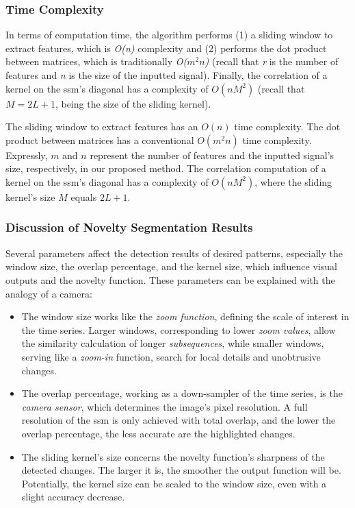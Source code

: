 \subsubsection{Time Complexity}
\label{sec:time_complexity}

In terms of computation time, the algorithm performs (1) a sliding window to extract features, which is \textit{O(n)} complexity and (2) performs the dot product between matrices, which is traditionally \textit{O($m^2n$)} (recall that \textit{r} is the number of features and \textit{n} is the size of the inputted signal). Finally, the correlation of a kernel on the \gls{ssm}'s diagonal has a complexity of $O(nM^2)$ (recall that $M=2L+1$, being the size of the sliding kernel).

The sliding window to extract features has an $O(n)$ time complexity. The dot product between matrices has a conventional $O(m^2n)$ time complexity. Expressly, $m$ and $n$ represent the number of features and the inputted signal's size, respectively, in our proposed method. The correlation computation of a kernel on the \gls{ssm}'s diagonal has a complexity of $O(nM^2)$, where the sliding kernel's size $M$ equals $2L+1$.

\subsubsection{Discussion of Novelty Segmentation Results}
\label{sec:novelty_seg_discussion}
Several parameters affect the detection results of desired patterns, especially the window size, the overlap percentage, and the kernel size, which influence visual outputs and the novelty function. These parameters can be explained with the analogy of a camera:

\begin{itemize}
    \item The window size works like the \textit{zoom function}, defining the scale of interest in the time series. Larger windows, corresponding to lower \textit{zoom values}, allow the similarity calculation of longer \textit{subsequences}, while smaller windows, serving like a \textit{zoom-in} function, search for local details and unobtrusive changes.
    \item The overlap percentage, working as a down-sampler of the time series, is the \textit{camera sensor}, which determines the image's pixel resolution. A full resolution of the \gls{ssm} is only achieved with total overlap, and the lower the overlap percentage, the less accurate are the highlighted changes.
    \item The sliding kernel's size concerns the novelty function's sharpness of the detected changes. The larger it is, the smoother the output function will be. Potentially, the kernel size can be scaled to the window size, even with a slight accuracy decrease.
\end{itemize}

